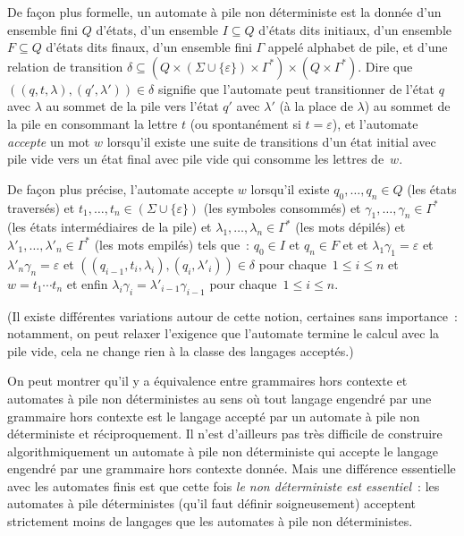 \documentclass[12pt,a4paper]{article}
\theoremstyle{definition}
\begin{document}
{\footnotesize

De façon plus formelle, un automate à pile non déterministe est la
donnée d'un ensemble fini $Q$ d'états, d'un ensemble $I \subseteq Q$
d'états dits initiaux, d'un ensemble $F \subseteq Q$ d'états dits
finaux, d'un ensemble fini $\Gamma$ appelé alphabet de pile, et d'une
relation de transition $\delta \subseteq (Q \times
(\Sigma\cup\{\varepsilon\}) \times \Gamma^*) \times (Q \times
\Gamma^*)$.  Dire que $((q,t,\lambda), (q',\lambda')) \in \delta$
signifie que l'automate peut transitionner de l'état $q$ avec
$\lambda$ au sommet de la pile vers l'état $q'$ avec $\lambda'$ (à la
place de $\lambda$) au sommet de la pile en consommant la lettre $t$
(ou spontanément si $t=\varepsilon$), et l'automate \emph{accepte} un
mot $w$ lorsqu'il existe une suite de transitions d'un état initial
avec pile vide vers un état final avec pile vide qui consomme les
lettres de $w$.

\smallskip

De façon plus précise, l'automate accepte $w$ lorsqu'il existe
$q_0,\ldots,q_n \in Q$ (les états traversés) et $t_1,\ldots,t_n \in
(\Sigma\cup\{\varepsilon\})$ (les symboles consommés) et
$\gamma_1,\ldots,\gamma_n \in \Gamma^*$ (les états intermédiaires de
la pile) et $\lambda_1,\ldots,\lambda_n \in \Gamma^*$ (les mots
dépilés) et $\lambda'_1,\ldots,\lambda'_n \in \Gamma^*$ (les mots
empilés) tels que : $q_0 \in I$ et $q_n\in F$ et et $\lambda_1\gamma_1
= \varepsilon$ et $\lambda'_n\gamma_n = \varepsilon$ et
$((q_{i-1},t_i,\lambda_i),(q_i,\lambda'_i)) \in \delta$ pour
chaque $1\leq i\leq n$ et $w = t_1\cdots t_n$ et enfin
$\lambda_i\gamma_i = \lambda'_{i-1}\gamma_{i-1}$ pour chaque $1\leq
i\leq n$.

(Il existe différentes variations autour de cette notion, certaines
sans importance : notamment, on peut relaxer l'exigence que l'automate
termine le calcul avec la pile vide, cela ne change rien à la classe
des langages acceptés.)

\par}

\medskip

On peut montrer qu'il y a équivalence entre grammaires hors contexte
et automates à pile non déterministes au sens où tout langage engendré
par une grammaire hors contexte est le langage accepté par un automate
à pile non déterministe et réciproquement.  Il n'est d'ailleurs pas
très difficile de construire algorithmiquement un automate à pile non
déterministe qui accepte le langage engendré par une grammaire hors
contexte donnée.  Mais une différence essentielle avec les automates
finis est que cette fois \emph{le non déterministe est essentiel} :
les automates à pile déterministes (qu'il faut définir soigneusement)
acceptent strictement moins de langages que les automates à pile
non déterministes.
\end{document}
